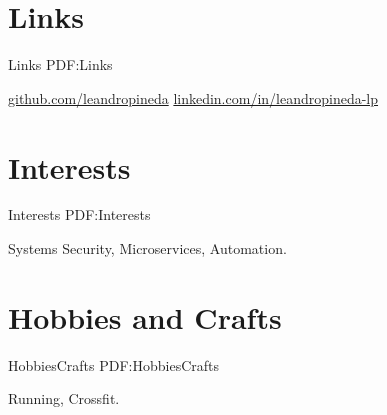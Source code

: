 \documentclass[letterpaper,MMMyyyy,nonstop]{simpleresumecv}
\begin{document}
\begin{body}

\section
{Links}
{Links}
{PDF:Links}

\BulletItem
\href{https://github.com/leandropineda}{github.com/leandropineda}
\BulletItem
\href{https://www.linkedin.com/in/leandropineda-lp}{linkedin.com/in/leandropineda-lp}


\section
{Interests}
{Interests}
{PDF:Interests}

Systems Security, Microservices, Automation.


\section
{Hobbies \newline
	and Crafts}
{HobbiesCrafts}
{PDF:HobbiesCrafts}

Running, Crossfit.



\end{body}
\end{document}
